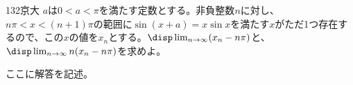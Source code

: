 \begin{prob}{132}{}{京大}
 $a$は$0<a<\pi$を満たす定数とする。非負整数$n$に対し、$n\pi<x<(n+1)\pi$の範囲に$\sin(x+a)=x\sin x$を満たす$x$がただ1つ存在するので、この$x$の値を$x_n$とする。$\disp \lim_{n\to\infty} (x_n-n\pi)$と、$\disp \lim_{n\to\infty} n(x_n-n\pi)$を求めよ。
\end{prob}
ここに解答を記述。